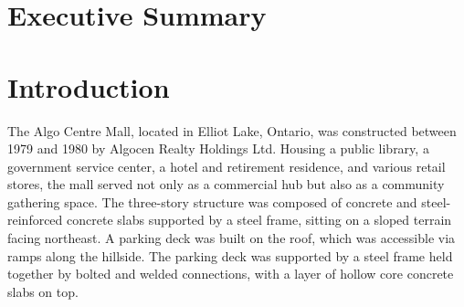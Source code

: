 \documentclass[12pt]{article}
\title{}
\date{June 2025}
\begin{document}
\maketitle


\newpage

\section*{Executive Summary}


\section{Introduction} 

The Algo Centre Mall, located in Elliot Lake, Ontario, was constructed between 1979 and 1980 by Algocen Realty Holdings Ltd. Housing a public library, a government service center, a hotel and retirement residence, and various retail stores, the mall served not only as a commercial hub but also as a community gathering space. The three-story structure was composed of concrete and steel-reinforced concrete slabs supported by a steel frame, sitting on a sloped terrain facing northeast. A parking deck was built on the roof, which was accessible via ramps along the hillside. The parking deck was supported by a steel frame held together by bolted and welded connections, with a layer of hollow core concrete slabs on top.
\end{document}
